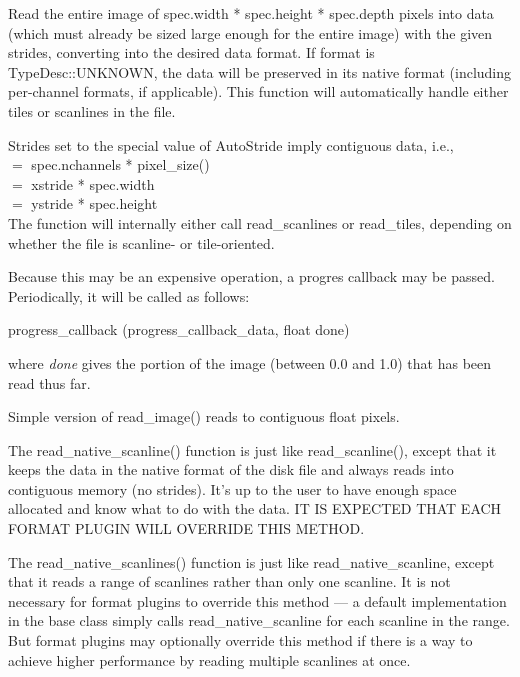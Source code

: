 Read the entire image of {\kw spec.width * spec.height * spec.depth}
pixels into data (which must already be sized large enough for
the entire image) with the given strides, converting into the desired
data format.  
If {\cf format} is {\cf TypeDesc::UNKNOWN}, the data will be preserved 
in its native format (including per-channel formats, if applicable).
This function will automatically handle either tiles or scanlines in
the file.

Strides set to the special value of {\kw AutoStride} imply contiguous
data, i.e., \\
 $=$ {\kw spec.nchannels * pixel_size()} \\
 $=$ {\kw xstride * spec.width} \\
 $=$ {\kw ystride * spec.height} \\
The function will internally either call {\kw read_scanlines} or 
{\kw read_tiles}, depending on whether the file is scanline- or
tile-oriented.

Because this may be an expensive operation, a progres callback may be passed.
Periodically, it will be called as follows:\\
\begin{code}
    progress_callback (progress_callback_data, float done)
\end{code}
\noindent where \emph{done} gives the portion of the image 
(between 0.0 and 1.0) that has been read thus far.
\apiend

Simple version of {\kw read_image()} reads to contiguous float pixels.
\apiend

The {\kw read_native_scanline()} function is just like {\kw
  read_scanline()}, except that it keeps the data in the native format
of the disk file and always reads into contiguous memory (no strides).
It's up to the user to have enough space allocated and know what to do
with the data.  IT IS EXPECTED THAT EACH FORMAT PLUGIN WILL OVERRIDE
THIS METHOD.
\apiend

The {\kw read_native_scanlines()} function is just like 
{\cf read_native_scanline}, except that it reads
a range of scanlines rather than only one scanline.  It is not necessary
for format plugins to override this method --- a default implementation
in the \ImageInput base class simply calls {\cf read_native_scanline}
for each scanline in the range.  But format plugins may optionally
override this method if there is a way to achieve higher performance by
reading multiple scanlines at once.
\apiend


